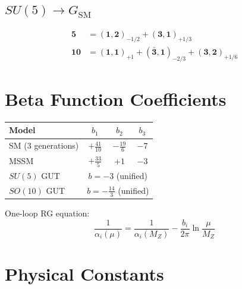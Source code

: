 \documentclass[11pt,a4paper,openright]{book}
\theoremstyle{plain}
\theoremstyle{definition}
\newcommand{\SM}{\mathrm{SM}}
\begin{document}
\subsection{$SU(5) \to G_{\SM}$}
\begin{align}
\mathbf{5} &= (\mathbf{1}, \mathbf{2})_{-1/2} + (\mathbf{3}, \mathbf{1})_{+1/3} \\
\mathbf{10} &= (\mathbf{1}, \mathbf{1})_{+1} + (\bar{\mathbf{3}}, \mathbf{1})_{-2/3} + (\mathbf{3}, \mathbf{2})_{+1/6}
\end{align}

\section{Beta Function Coefficients}

\begin{center}
\begin{tabular}{lccc}
\toprule
\textbf{Model} & $b_1$ & $b_2$ & $b_3$ \\
\midrule
SM (3 generations) & $+\frac{41}{10}$ & $-\frac{19}{6}$ & $-7$ \\
MSSM & $+\frac{33}{5}$ & $+1$ & $-3$ \\
$SU(5)$ GUT & \multicolumn{3}{c}{$b = -3$ (unified)} \\
$SO(10)$ GUT & \multicolumn{3}{c}{$b = -\frac{14}{3}$ (unified)} \\
\bottomrule
\end{tabular}
\end{center}

One-loop RG equation:
\begin{equation}
\frac{1}{\alpha_i(\mu)} = \frac{1}{\alpha_i(M_Z)} - \frac{b_i}{2\pi} \ln\frac{\mu}{M_Z}
\end{equation}

\section{Physical Constants}
\end{document}
